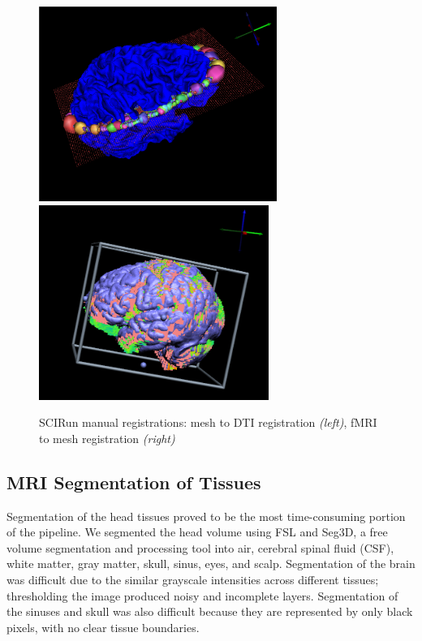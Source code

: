 \begin{figure}[H]
\begin{center}
\includegraphics[height = 2.5in]{Figures/DTI_reg}
\includegraphics[height = 2.5in]{Figures/fmri_reg}
\caption{SCIRun manual registrations: mesh to DTI registration \textit{(left)}, fMRI to mesh registration \textit{(right)}}
\label{fig:dtireg}
\end{center}
\end{figure}

\subsection{MRI Segmentation of Tissues}
\label{sec:Seg}


Segmentation of the head tissues proved to be the most time-consuming portion of the pipeline. We segmented the head volume using FSL and Seg3D, a free volume segmentation and processing tool \cite{ref:seg3d} into air, cerebral spinal fluid (CSF), white matter, gray matter, skull, sinus, eyes, and scalp. Segmentation of the brain was difficult due to the similar grayscale intensities across different tissues; thresholding the image produced noisy and incomplete layers. Segmentation of the sinuses and skull was also difficult because they are represented by only black pixels, with no clear tissue boundaries.

